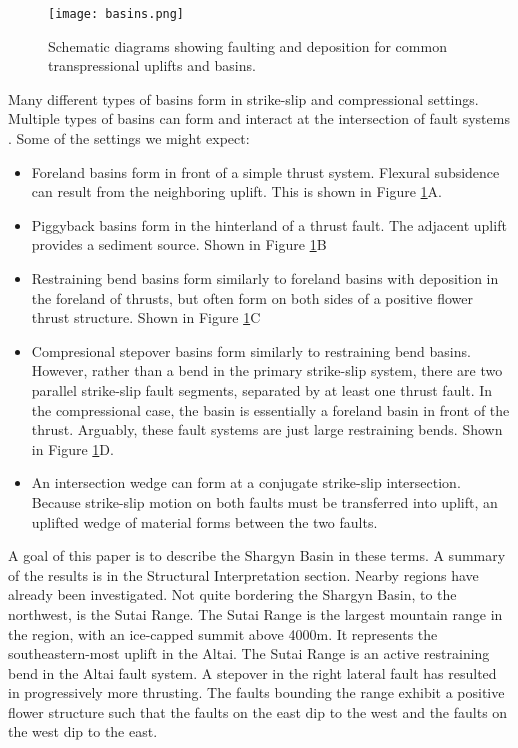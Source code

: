 	
\begin{figure}[h!]
  \centering
  \texttt{[image: basins.png]}
  \caption{Schematic diagrams showing faulting and deposition for common transpressional uplifts and basins.}
  \label{basintypes}
\end{figure}

Many different types of basins form in strike-slip and compressional settings. Multiple types of basins can form and interact at the intersection of fault systems \citep{Busby1995}. Some of the settings we might expect:
\begin{itemize}
	\item Foreland basins form in front of a simple thrust system. Flexural subsidence can result from the neighboring uplift. This is shown in Figure \ref{basintypes}A. 
	\item Piggyback basins form in the hinterland of a thrust fault. The adjacent uplift provides a sediment source. Shown in Figure \ref{basintypes}B
	\item Restraining bend basins form similarly to foreland basins with deposition in the foreland of thrusts, but often form on both sides of a positive flower thrust structure. Shown in Figure \ref{basintypes}C
	\item Compresional stepover basins form similarly to restraining bend basins. However, rather than a bend in the primary strike-slip system, there are two parallel strike-slip fault segments, separated by at least one thrust fault. In the compressional case, the basin is essentially a foreland basin in front of the thrust. Arguably, these fault systems are just large restraining bends. Shown in Figure \ref{basintypes}D.
	\item An intersection wedge can form at a conjugate strike-slip intersection. Because strike-slip motion on both faults must be transferred into uplift, an uplifted wedge of material forms between the two faults. 
\end{itemize}

	A goal of this paper is to describe the Shargyn Basin in these terms. A summary of the results is in the Structural Interpretation section. Nearby regions have already been investigated. Not quite bordering the Shargyn Basin, to the northwest, is the Sutai Range. The Sutai Range is the largest mountain range in the region, with an ice-capped summit above 4000m. It represents the southeastern-most uplift in the Altai. The Sutai Range is an active restraining bend in the Altai fault system\citep{Cunningham2003}\citep{Howard2006}. A stepover in the right lateral fault has resulted in progressively more thrusting. The faults bounding the range exhibit a positive flower structure such that the faults on the east dip to the west and the faults on the west dip to the east\citep{Cunningham2003}. 
	
